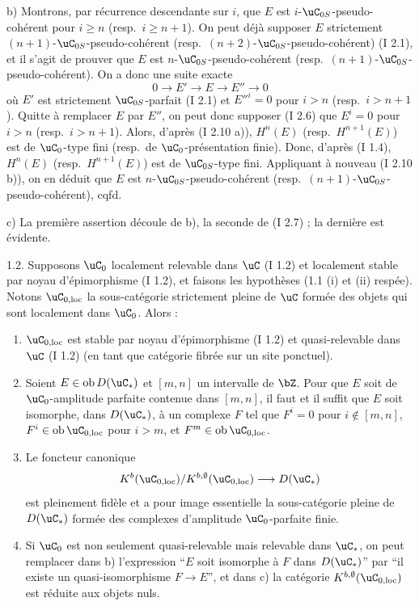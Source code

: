 b) Montrons, par r\'{e}currence descendante sur $i$, que $E$ est $i$-$\uC_{0S}$-pseudo-coh\'{e}rent pour $i \geq n$ (resp.~$i \geq n+1$). On peut d\'{e}j\`{a} supposer $E$ strictement $(n+1)$-$\uC_{0S}$-pseudo-coh\'{e}rent (resp.~$(n+2)$-$\uC_{0S}$-pseudo-coh\'{e}rent) (I 2.1), et il s'agit de prouver que $E$ est $n$-$\uC_{0S}$-pseudo-coh\'{e}rent (resp.~$(n+1)$-$\uC_{0S}$-pseudo-coh\'{e}rent). On a donc une suite exacte
\[
0 \longrightarrow E' \longrightarrow E \longrightarrow E'' \longrightarrow 0
\]
o\`{u} $E'$ est strictement $\uC_{0S}$-parfait (I 2.1) et $E''^i = 0$ pour $i > n$ (resp.~$i > n+1$). Quitte \`{a} remplacer $E$ par $E''$, on peut donc supposer (I 2.6) que $E^i = 0$ pour $i > n$ (resp.~$i > n+1$). Alors, d'apr\`{e}s (I 2.10 a)), $H^n(E)$ (resp.~$H^{n+1}(E)$) est de $\uC_0$-type fini (resp.~de $\uC_0$-pr\'{e}sentation finie). Donc, d'apr\`{e}s (I 1.4), $H^n(E)$ (resp.~$H^{n+1}(E)$) est de $\uC_{0S}$-type fini. Appliquant \`{a} nouveau (I 2.10 b)), on en d\'{e}duit que $E$ est $n$-$\uC_{0S}$-pseudo-coh\'{e}rent (resp.~$(n+1)$-$\uC_{0S}$-pseudo-coh\'{e}rent), cqfd.

c) La premi\`{e}re assertion d\'{e}coule de b), la seconde de (I 2.7) ; la derni\`{e}re est \'{e}vidente.

\begin{proposition} 1.2.
Supposons $\uC_0$ localement relevable dans $\uC$ (I 1.2) et localement stable par noyau d'\'{e}pimorphisme (I 1.2), et faisons les hypoth\`{e}ses (1.1 (i) et (ii) resp\'{e}e). Notons $\uC_{0,\mathrm{loc}}$ la sous-cat\'{e}gorie strictement pleine de $\uC$ form\'{e}e des objets qui sont localement dans $\uC_0$. Alors :
\begin{enumerate}
\item[a)] $\uC_{0,\mathrm{loc}}$ est stable par noyau d'\'{e}pimorphisme (I 1.2) et quasi-relevable dans $\uC$ (I 1.2) (en tant que cat\'{e}gorie fibr\'{e}e sur un site ponctuel).
\item[b)] Soient $E \in \operatorname{ob} D(\uC_*)$ et $[m,n]$ un intervalle de $\bZ$. Pour que $E$ soit de $\uC_0$-amplitude parfaite contenue dans $[m,n]$, il faut et il suffit que $E$ soit isomorphe, dans $D(\uC_*)$, \`{a} un complexe $F$ tel que $F^i = 0$ pour $i \notin [m,n]$, $F^i \in \operatorname{ob} \uC_{0,\mathrm{loc}}$ pour $i > m$, et $F^m \in \operatorname{ob} \uC_{0,\mathrm{loc}}$.
\item[c)] Le foncteur canonique
\[
K^b(\uC_{0,\mathrm{loc}}) / K^{b,\emptyset}(\uC_{0,\mathrm{loc}}) \longrightarrow D(\uC_*)
\]
est pleinement fid\`{e}le et a pour image essentielle la sous-cat\'{e}gorie pleine de $D(\uC_*)$ form\'{e}e des complexes d'amplitude $\uC_0$-parfaite finie.
\item[d)] Si $\uC_0$ est non seulement quasi-relevable mais relevable dans $\uC_*$, on peut remplacer dans b) l'expression ``$E$ soit isomorphe \`{a} $F$ dans $D(\uC_*)$'' par ``il existe un quasi-isomorphisme $F \rightarrow E$'', et dans c) la cat\'{e}gorie $K^{b,\emptyset}(\uC_{0,\mathrm{loc}})$ est r\'{e}duite aux objets nuls.
\end{enumerate}
\end{proposition}

